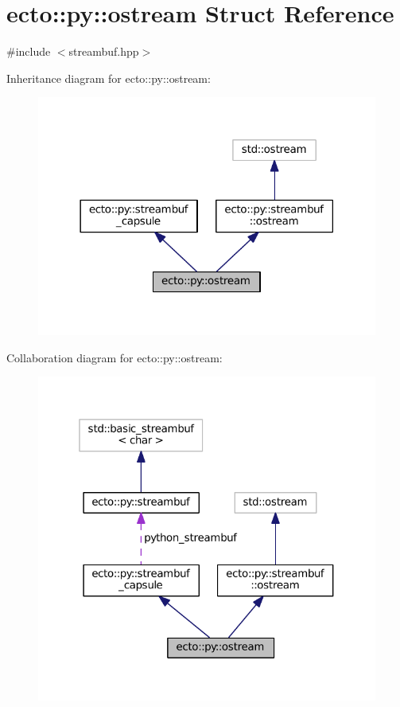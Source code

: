 \hypertarget{structecto_1_1py_1_1ostream}{\section{ecto\-:\-:py\-:\-:ostream Struct Reference}
\label{structecto_1_1py_1_1ostream}
}


{\ttfamily \#include $<$streambuf.\-hpp$>$}



Inheritance diagram for ecto\-:\-:py\-:\-:ostream\-:\nopagebreak
\begin{figure}[H]
\begin{center}
\leavevmode
\includegraphics[width=318pt]{structecto_1_1py_1_1ostream__inherit__graph}
\end{center}
\end{figure}


Collaboration diagram for ecto\-:\-:py\-:\-:ostream\-:\nopagebreak
\begin{figure}[H]
\begin{center}
\leavevmode
\includegraphics[width=321pt]{structecto_1_1py_1_1ostream__coll__graph}
\end{center}
\end{figure}
